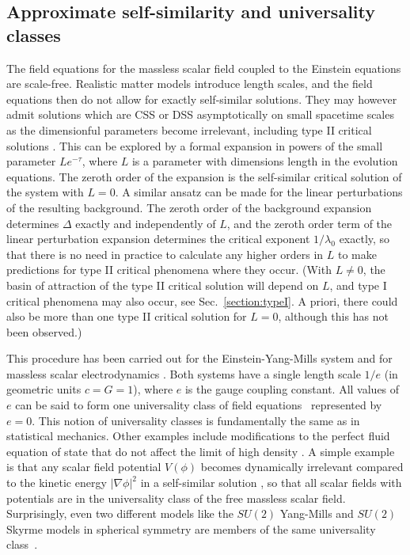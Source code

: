\documentclass{article}
\begin{document}

\subsection{Approximate self-similarity and universality classes}
\label{section:universalityclasses}

The field equations for the massless scalar field coupled to the
Einstein equations are scale-free. Realistic matter models introduce
length scales, and the field equations then do not allow for
exactly self-similar solutions. They may however admit solutions which
are CSS or DSS asymptotically on small spacetime scales as the
dimensionful parameters become irrelevant, including type II critical
solutions \cite{Choptuik94,BradyChambersGoncalves,ChoptuikChmajBizon}.
This can be explored by a formal expansion in powers of the small
parameter $Le^{-\tau}$, where $L$ is a parameter with dimensions
length in the evolution equations. The zeroth order of the expansion
is the self-similar critical solution of the system with
$L=0$. A similar ansatz can be made for the linear perturbations of
the resulting background. The zeroth order of the background expansion
determines $\Delta$ exactly and independently of $L$, and the
zeroth order term of the linear perturbation expansion determines the
critical exponent $1/\lambda_0$ exactly, so that there is no need in
practice to calculate any higher orders in $L$ to make predictions for
type II critical phenomena where they occur. (With $L\ne
0$, the basin of attraction of the type II critical solution will
depend on $L$, and type I critical phenomena may also occur, see
Sec.~\ref{section:typeI}. A priori, there could also be more than one
type II critical solution for $L=0$, although this has not been
observed.)

This procedure has been carried out for the Einstein-Yang-Mills system
\cite{Gundlach_EYM} and for massless scalar electrodynamics
\cite{GundlachMartin}. Both systems have a single length scale $1/e$
(in geometric units $c=G=1$), where $e$ is the gauge coupling
constant. All values of $e$ can be said to form one universality class
of field equations~\cite{HaraKoikeAdachi} represented by $e=0$. This
notion of universality classes is fundamentally the same as in
statistical mechanics. Other examples include modifications to the
perfect fluid equation of state that do not affect the limit of high
density \cite{NeilsenChoptuik}. A simple example is 
that any scalar field potential $V(\phi)$ becomes dynamically
irrelevant compared to the kinetic energy $|\nabla\phi|^2$ in a
self-similar solution \cite{Choptuik94}, so that all scalar fields
with potentials are in the universality class of the free massless
scalar field.  Surprisingly, even two different models like the
$SU(2)$ Yang-Mills and $SU(2)$ Skyrme models in spherical symmetry are
members of the same universality class~\cite{BizonChmajTabor}.
\end{document}
